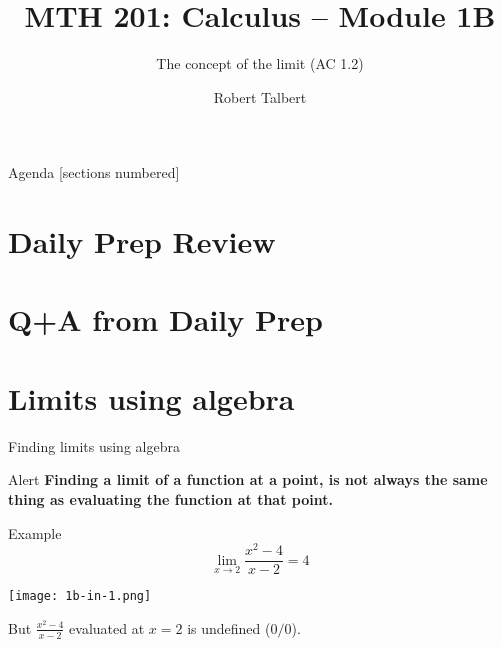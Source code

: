 \documentclass[10pt]{beamer}
\title{MTH 201: Calculus -- Module 1B}
\subtitle{The concept of the limit (AC 1.2)}
\date{}
\author{Robert Talbert}
\institute{Grand Valley State University}
\begin{document}
\maketitle

\begin{frame}{Agenda}
  [sections numbered]
  \tableofcontents%
\end{frame}





\section[Review of Daily Prep]{Daily Prep Review}


\section[Q+A]{Q+A from Daily Prep}

\section[Limits using algebra]{Limits using algebra}

\begin{frame}{Finding limits using algebra}
      \begin{alertblock}{Alert}
        \textbf{Finding a limit of a function at a point, is not always the same thing as evaluating the function at that point.}
      \end{alertblock}
      
     \begin{exampleblock}{Example}
     \begin{equation*}
         \lim_{x \to 2} \frac{x^2-4}{x-2} = 4
     \end{equation*}
    \begin{center}
             \texttt{[image: 1b-in-1.png]}
    \end{center}
         But $\frac{x^2 - 4}{x-2}$ evaluated at $x=2$ is undefined ($0/0$). 
     \end{exampleblock}
\end{frame}
\end{document}
